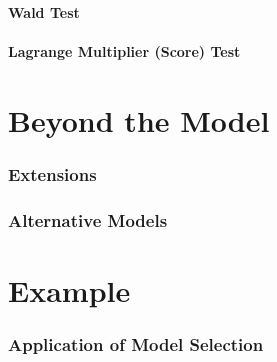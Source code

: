 \subsection{Wald Test}
\subsection{Lagrange Multiplier (Score) Test}
\part{Beyond the Model}
\section{Extensions}
\section{Alternative Models}
\part{Example}
\section{Application of Model Selection}